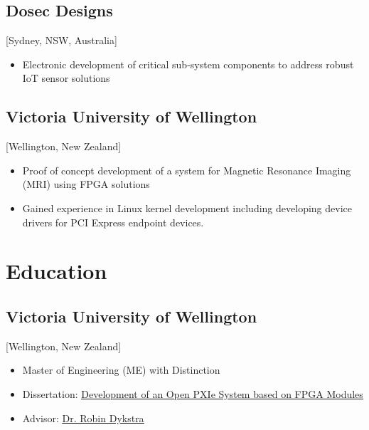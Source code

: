 \documentclass{mycv}
\begin{document}
\subsection{Dosec Designs}[Sydney, NSW, Australia]
\begin{positions}
\end{positions}

\begin{itemize}[noitemsep]
  \item Electronic development of critical sub-system components to address robust IoT sensor solutions
\end{itemize}

\subsection{Victoria University of Wellington}[Wellington, New Zealand]
\begin{positions}
\end{positions}

\begin{itemize}[noitemsep]
  \item Proof of concept development of a system for Magnetic Resonance Imaging (MRI) using FPGA solutions
  \item Gained experience in Linux kernel development including developing device drivers for PCI Express endpoint devices.
\end{itemize}

\section{Education}

\subsection{Victoria University of Wellington}[Wellington, New Zealand]
\vspace{-\parskip}%
\begin{itemize}[label={}]
  \item Master of Engineering (ME) with Distinction 
  \item Dissertation: \href{https://tewaharoa.victoria.ac.nz/discovery/fulldisplay?docid=alma99178858497202386&context=L&vid=64VUW_INST:VUWNUI&search_scope=MyInst_and_CI&tab=all&lang=en}{\underline{Development of an Open PXIe System based on FPGA Modules}}
  \item Advisor: \href{https://people.wgtn.ac.nz/robin.dykstra}{\underline{Dr. Robin Dykstra}}
\end{itemize}
\end{document}
